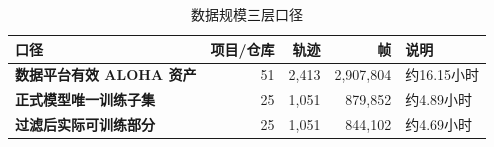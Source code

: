 \begin{table}[H]
\centering
\caption{数据规模三层口径}
\begin{tabularx}{\textwidth}{>{\bfseries}p{38mm}r r r X}
\toprule
口径 & 项目/仓库 & 轨迹 & 帧 & 说明\\
\midrule
数据平台有效 ALOHA 资产 & 51 & 2,413 & 2,907,804 & 约16.15小时\\
正式模型唯一训练子集 & 25 & 1,051 & 879,852 & 约4.89小时\\
过滤后实际可训练部分 & 25 & 1,051 & 844,102 & 约4.69小时\\
\bottomrule
\end{tabularx}
\end{table}
